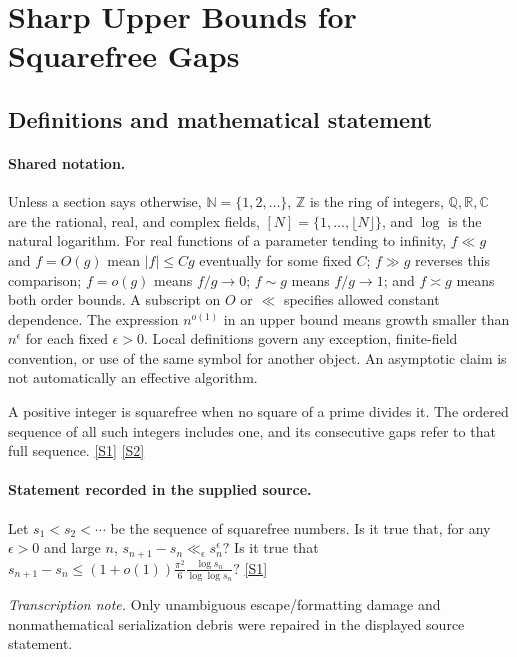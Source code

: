 \documentclass[11pt,a4paper]{article}
\newcommand{\N}{\mathbb{N}}
\newcommand{\Z}{\mathbb{Z}}
\newcommand{\Q}{\mathbb{Q}}
\newcommand{\R}{\mathbb{R}}
\newcommand{\C}{\mathbb{C}}
\newcommand{\sref}[2]{\hyperlink{source:#1:#2}{[S#2]}}
\begin{document}
\section{Sharp Upper Bounds for Squarefree Gaps}\label{statement}


\subsection{Definitions and mathematical statement}

\paragraph{Shared notation.}Unless a section says otherwise, $\N=\{1,2,\ldots\}$,
$\Z$ is the ring of integers, $\Q,\R,\C$ are the rational, real, and complex
fields, $[N]=\{1,\ldots,\lfloor N\rfloor\}$, and $\log$ is the natural
logarithm. For real functions of a parameter tending to infinity,
$f\ll g$ and $f=O(g)$ mean $|f|\leq Cg$ eventually for some fixed $C$;
$f\gg g$ reverses this comparison; $f=o(g)$ means $f/g\to0$;
$f\sim g$ means $f/g\to1$; and $f\asymp g$ means both order bounds.
A subscript on $O$ or $\ll$ specifies allowed constant dependence.
The expression $n^{o(1)}$ in an upper bound means growth smaller than
$n^\epsilon$ for each fixed $\epsilon>0$. Local definitions govern any
exception, finite-field convention, or use of the same symbol for another
object. An asymptotic claim is not automatically an effective algorithm.



A positive integer is squarefree when no square of a prime divides it. The ordered sequence of all such integers includes one, and its consecutive gaps refer to that full sequence. \sref{statement}{1} \sref{statement}{2}

\paragraph{Statement recorded in the supplied source.}
Let $s_1<s_2<\cdots$ be the sequence of squarefree numbers. Is it true that, for any $\epsilon>0$ and large $n$, $ s_{n+1}-s_n \ll_\epsilon s_n^{\epsilon}? $ Is it true that $ s_{n+1}-s_n \leq (1+o(1))\frac{\pi^2}{6}\frac{\log s_n}{\log\log s_n}? $ \sref{statement}{1}

{\small\emph{Transcription note.} Only unambiguous escape/formatting damage and nonmathematical serialization debris were repaired in the displayed source statement.}
\end{document}
